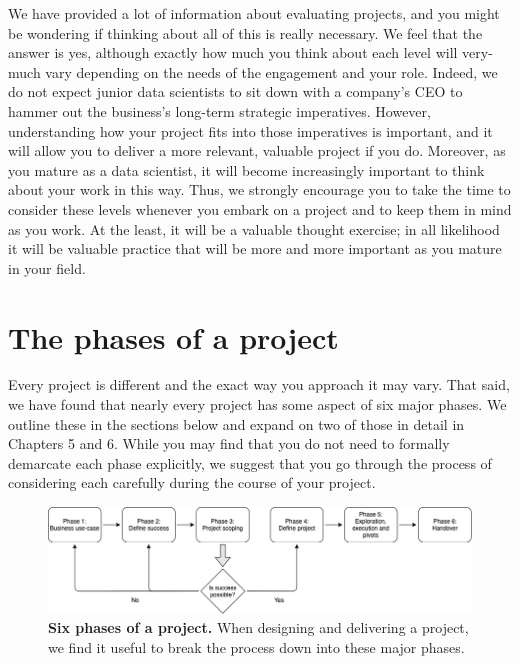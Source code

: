 \documentclass[
]{book}
\begin{document}
We have provided a lot of information about evaluating projects, and you might be wondering if thinking about all of this is really necessary. We feel that the answer is yes, although exactly how much you think about each level will very-much vary depending on the needs of the engagement and your role. Indeed, we do not expect junior data scientists to sit down with a company's CEO to hammer out the business's long-term strategic imperatives. However, understanding how your project fits into those imperatives is important, and it will allow you to deliver a more relevant, valuable project if you do. Moreover, as you mature as a data scientist, it will become increasingly important to think about your work in this way. Thus, we strongly encourage you to take the time to consider these levels whenever you embark on a project and to keep them in mind as you work. At the least, it will be a valuable thought exercise; in all likelihood it will be valuable practice that will be more and more important as you mature in your field.

\hypertarget{phases}{%
\chapter{The phases of a project}\label{phases}}

Every project is different and the exact way you approach it may vary. That said, we have found that nearly every project has some aspect of six major phases. We outline these in the sections below and expand on two of those in detail in Chapters 5 and 6. While you may find that you do not need to formally demarcate each phase explicitly, we suggest that you go through the process of considering each carefully during the course of your project.

\begin{figure}
\includegraphics[width=1\linewidth]{figures/Figure_2-phases} \caption{\textbf{Six phases of a project.} When designing and delivering a project, we find it useful to break the process down into these major phases.}\label{fig:bottom-fig}
\end{figure}
\end{document}
